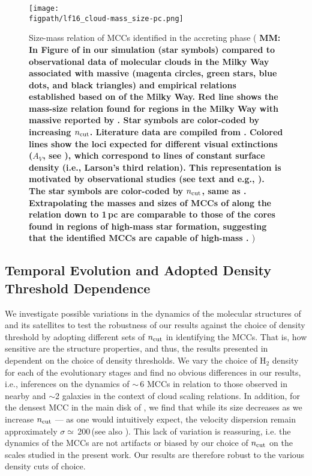 \IfFileExists{emulateapjlegacy.cls}{\documentclass[iop]{emulateapjlegacy}}{\documentclass[iop]{emulateapj}}
\newcommand{\MM}[1]{({\bf \color{mmcolor} MM: #1})}
\def\figpath{./Fig}
\begin{document}
\begin{figure*}[htbp]
\centering
\texttt{[image: \\figpath/lf16\_cloud-mass\_size-pc.png]}
\caption{
Size-mass relation of MCCs identified in the accreting phase \MM{In
  Figure  of \flower in our simulation (star symbols) compared to observational data of molecular clouds in the Milky Way associated with massive \SF (magenta circles, green stars, blue dots, and black triangles) and empirical relations established based on \obs of the Milky Way. Red line shows the 
mass-size relation found for regions in the Milky Way with massive \SF reported by \citet{Kauffmann10b}. Star symbols are color-coded by increasing $n_{\rm cut}$. Literature data are compiled from \citet{Beuther02a, Mueller02a, Hill05a, Motte07a}. 
Colored lines show the loci expected for different visual extinctions ($A_V$, see \Eq{constantcolumndensity}), which correspond to lines of
constant surface density (i.e., Larson's third relation). This representation is motivated by observational studies (see text and e.g., \citealt{Lombardi10a}).
The star symbols are color-coded by $n_{\rm cut}$, same as \Fig{larsons_single}. 
Extrapolating the masses and sizes of MCCs of \flower along the \citet{Kauffmann10b} 
relation down to 1\,pc are comparable  to those  of  the  cores  found  in regions  of high-mass star formation, suggesting that the identified MCCs are capable of high-mass \SF.
\label{fig:MR}}
}
\end{figure*}

\subsection{Temporal Evolution and Adopted Density Threshold Dependence}\label{sec:ncut}
We investigate possible variations in the dynamics of the molecular structures of \flower and its satellites to test the robustness of our results against the choice of density threshold by adopting different sets of $n_{\rm cut}$ in identifying the MCCs. That is, how sensitive are the structure properties, and thus, the results presented in  dependent on the choice of density thresholds.
%
We vary the choice of H$_2$ density for each of the evolutionary stages and find no obvious differences in our results, i.e., inferences on the dynamics of \z$\sim$\,6 MCCs in relation to those observed in nearby and \z$\sim$2 galaxies in the context of cloud scaling relations.
%
In addition, for the densest MCC in the main disk of \flower, we find that while its size decreases as we increase $n_{\rm cut}$ --- as one would intuitively expect, the velocity dispersion remain approximately $\sigma\simeq$\,200\,\kms (see also ).
%
This lack of variation is reassuring, i.e. the dynamics of the MCCs are not artifacts or biased by our choice of $n_{\rm cut}$ on the scales studied in the present work. Our results are therefore robust to the various density cuts of choice.
\end{document}
